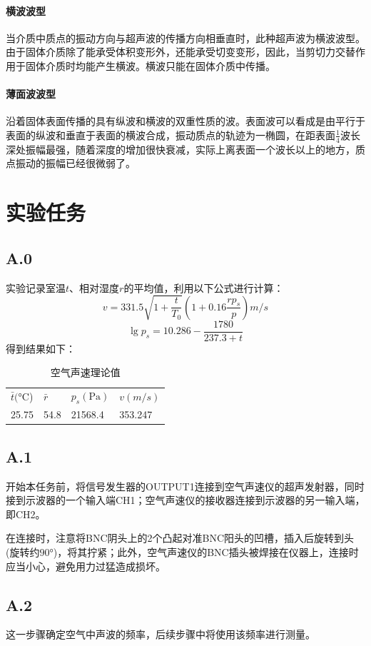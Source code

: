 \documentclass[UTF8,a4paper]{article}%
\begin{document}
\paragraph{横波波型}
当介质中质点的振动方向与超声波的传播方向相垂直时，此种超声波为横波波型。由于固体介质除了能承受体积变形外，还能承受切变变形，因此，当剪切力交替作用于固体介质时均能产生横波。横波只能在固体介质中传播。
\paragraph{薄面波波型}
沿着固体表面传播的具有纵波和横波的双重性质的波。表面波可以看成是由平行于表面的纵波和垂直于表面的横波合成，振动质点的轨迹为一椭圆，在距表面$\frac{1}{4}$波长深处振幅最强，随着深度的增加很快衰减，实际上离表面一个波长以上的地方，质点振动的振幅已经很微弱了。
\section{实验任务}
\subsection*{A.0}
实验记录室温$t$、相对湿度$r$的平均值，利用以下公式进行计算：
$$v=331.5\sqrt{1+\frac{t}{T_0}}(1+0.16\frac{rp_s}{p})\unit{m/s}$$
$$\lg p_s=10.286-\frac{1780}{237.3+t}$$
得到结果如下：
\begin{table}[H]
    \centering
    \caption{空气声速理论值}
    \label{tab:a0}
    \begin{tabular}{llll}
        \hline
        $\bar{t}(\unit{\degreeCelsius}$) & $\bar{r}$ & $p_s(\unit{\pascal})$ & $v(\unit{m/s})$ \\
        25.75                            & 54.8      & 21568.4               & 353.247         \\ \hline
    \end{tabular}
\end{table}
\subsection*{A.1}
开始本任务前，将信号发生器的OUTPUT1连接到空气声速仪的超声发射器，同时接到示波器的一个输入端CH1；空气声速仪的接收器连接到示波器的另一输入端，即CH2。

在连接时，注意将BNC阴头上的2个凸起对准BNC阳头的凹槽，插入后旋转到头(旋转约$\ang{90}$)，将其拧紧；此外，空气声速仪的BNC插头被焊接在仪器上，连接时应当小心，避免用力过猛造成损坏。
\subsection*{A.2}
这一步骤确定空气中声波的频率，后续步骤中将使用该频率进行测量。
\end{document}
